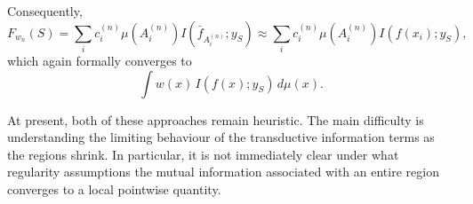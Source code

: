 Consequently,
\begin{equation*}
F_{w_n}(S)
=
\sum_i
c_i^{(n)}
\mu(A_i^{(n)})
I(\bar f_{A_i^{(n)}};y_S)
\approx
\sum_i
c_i^{(n)}
\mu(A_i^{(n)})
I(f(x_i);y_S),
\end{equation*}
which again formally converges to
\begin{equation*}
\int
w(x)\,
I(f(x);y_S)\,
d\mu(x).
\end{equation*}

At present, both of these approaches remain heuristic. The main difficulty is understanding the limiting behaviour of the transductive information terms as the regions shrink. In particular, it is not immediately clear under what regularity assumptions the mutual information associated with an entire region converges to a local pointwise quantity.